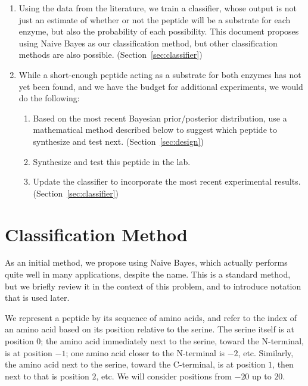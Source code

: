 \documentclass[12pt]{article}
\begin{document}
\begin{enumerate}
\item Using the data from the literature, we train a classifier, whose output is not just an estimate of whether or not the peptide will be a substrate for each enzyme, but also the probability of each possibility.
  This document proposes using Naive Bayes as our classification method, but other classification methods are also possible. (Section~\ref{sec:classifier})
\item While a short-enough peptide acting as a substrate for both enzymes has not yet been found, and we have the budget for additional experiments, we would do the following:
  \begin{enumerate}
    \item Based on the most recent Bayesian prior/posterior distribution, use a mathematical method described below to suggest which peptide to synthesize and test next. (Section~\ref{sec:design})
    \item Synthesize and test this peptide in the lab.
    \item Update the classifier to incorporate the most recent experimental results. (Section~\ref{sec:classifier})
  \end{enumerate}
\end{enumerate}

\section{Classification Method}\label{sec:NB}
\label{sec:classifier}

As an initial method, we propose using Naive Bayes, which actually performs quite well in many applications, despite the name.
This is a standard method, but we briefly review it in the context of this problem, and to introduce notation that is used later.

We represent a peptide by its sequence of amino acids, and refer to the index of an amino acid based on its position relative to the serine.  The serine itself is at position 0;
the amino acid immediately next to the serine, toward the N-terminal, is at position $-1$; one amino acid closer to the N-terminal is $-2$, etc.  Similarly, the amino acid next to the serine, toward the C-terminal, is at position $1$, then next to that is position $2$, etc.
We will consider positions from $-20$ up to $20$.
\end{document}
